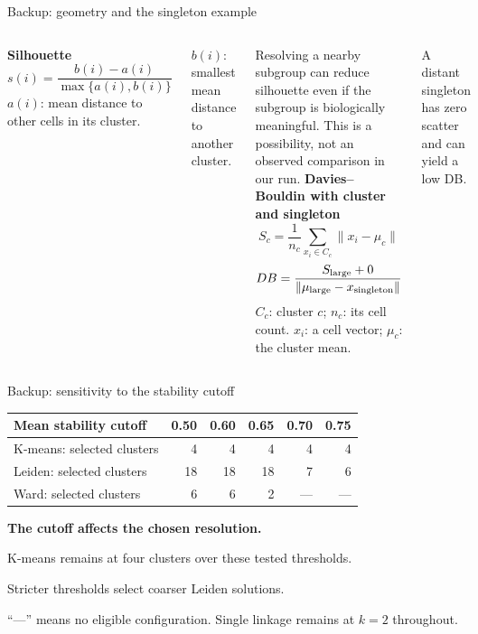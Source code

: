 \documentclass[aspectratio=169,10pt]{beamer}
\begin{document}
\begin{frame}{Backup: geometry and the singleton example}
  \begin{columns}[T,onlytextwidth]
    \textbf{Silhouette}
    \[
      s(i)=\frac{b(i)-a(i)}{\max\{a(i),b(i)\}}
    \]
    \small $a(i)$: mean distance to other cells in its cluster.\par
    $b(i)$: smallest mean distance to another cluster.\par
    \vspace{2mm}
    Resolving a nearby subgroup can reduce silhouette even if the subgroup is biologically meaningful. This is a possibility, not an observed comparison in our run.
    \textbf{Davies--Bouldin with cluster and singleton}
    \[
      S_c=\frac{1}{n_c}\sum_{x_i\in C_c}\lVert x_i-\mu_c\rVert
    \]
    \[
      DB=\frac{S_{\rm large}+0}{\lVert\mu_{\rm large}-x_{\rm singleton}\rVert}
    \]
    \small $C_c$: cluster $c$; $n_c$: its cell count. $x_i$: a cell vector; $\mu_c$: the cluster mean.\par A distant singleton has zero scatter and can yield a low DB.
  \end{columns}
\end{frame}

\begin{frame}{Backup: sensitivity to the stability cutoff}
  \small\renewcommand{\arraystretch}{1.4}
  \begin{tabular}{@{}lrrrrr@{}}
    \toprule
    Mean stability cutoff & 0.50 & 0.60 & 0.65 & 0.70 & 0.75\\
    \midrule
    K-means: selected clusters & 4 & 4 & 4 & 4 & 4\\
    Leiden: selected clusters & 18 & 18 & 18 & 7 & 6\\
    Ward: selected clusters & 6 & 6 & 2 & --- & ---\\
    \bottomrule
  \end{tabular}
  \vspace{2mm}\par
  \textbf{The cutoff affects the chosen resolution.}\par
  K-means remains at four clusters over these tested thresholds.\par
  Stricter thresholds select coarser Leiden solutions.
  \vspace{3mm}\par
  ``---'' means no eligible configuration. Single linkage remains at $k=2$ throughout.
\end{frame}
\end{document}
